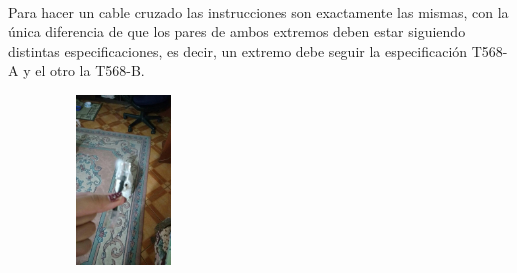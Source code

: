 \documentclass{udpreport}
\begin{document}
\begin{itemize}
    	\\Para hacer un cable cruzado las instrucciones son exactamente las mismas, con la única diferencia de que los pares de ambos extremos deben estar siguiendo distintas especificaciones, es decir, un extremo debe seguir la especificación T568-A y el otro la T568-B.
    	\begin{figure}[h]
		    \centering
    	\includegraphics[width=4cm, height=4.5cm]{cable.jpg}
    	\end{figure}
\end{itemize}
\end{document}
